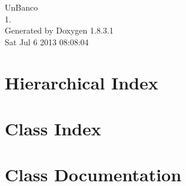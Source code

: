 \documentclass{book}
\begin{document}
\hypersetup{pageanchor=false,citecolor=blue}
\begin{titlepage}
\vspace*{7cm}
\begin{center}
{\Large Un\-Banco \\[1ex]\large 1. }\\
\vspace*{1cm}
{\large Generated by Doxygen 1.8.3.1}\\
\vspace*{0.5cm}
{\small Sat Jul 6 2013 08:08:04}\\
\end{center}
\end{titlepage}
\clearemptydoublepage
{}
\tableofcontents
\clearemptydoublepage
{}
\hypersetup{pageanchor=true,citecolor=blue}
\chapter{Hierarchical Index}

\chapter{Class Index}

\chapter{Class Documentation}


































\printindex
\end{document}
